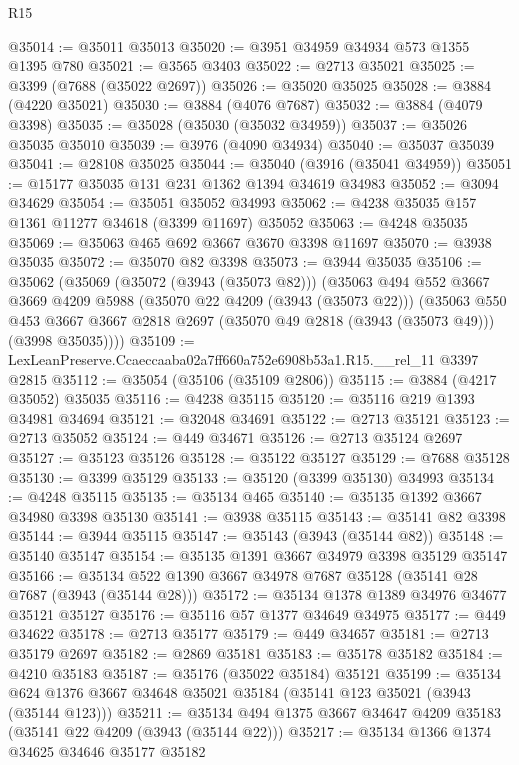 \begin{lexlean}{R15}
\begin{coremodule}
@35014 := @35011 @35013
@35020 := @3951 @34959 @34934 @573 @1355 @1395 @780
@35021 := @3565 @3403
@35022 := @2713 @35021
@35025 := @3399 (@7688 (@35022 @2697))
@35026 := @35020 @35025
@35028 := @3884 (@4220 @35021)
@35030 := @3884 (@4076 @7687)
@35032 := @3884 (@4079 @3398)
@35035 := @35028 (@35030 (@35032 @34959))
@35037 := @35026 @35035 @35010
@35039 := @3976 (@4090 @34934)
@35040 := @35037 @35039
@35041 := @28108 @35025
@35044 := @35040 (@3916 (@35041 @34959))
@35051 := @15177 @35035 @131 @231 @1362 @1394 @34619 @34983
@35052 := @3094 @34629
@35054 := @35051 @35052 @34993
@35062 := @4238 @35035 @157 @1361 @11277 @34618 (@3399 @11697) @35052
@35063 := @4248 @35035
@35069 := @35063 @465 @692 @3667 @3670 @3398 @11697
@35070 := @3938 @35035
@35072 := @35070 @82 @3398
@35073 := @3944 @35035
@35106 := @35062
    (@35069
      (@35072 (@3943 (@35073 @82)))
      (@35063
        @494
        @552
        @3667
        @3669
        @4209
        @5988
        (@35070 @22 @4209 (@3943 (@35073 @22)))
        (@35063
          @550
          @453
          @3667
          @3667
          @2818
          @2697
          (@35070 @49 @2818 (@3943 (@35073 @49)))
          (@3998 @35035))))
@35109 := LexLeanPreserve.Ccaeccaaba02a7ff660a752e6908b53a1.R15.__rel_11 @3397 @2815
@35112 := @35054 (@35106 (@35109 @2806))
@35115 := @3884 (@4217 @35052) @35035
@35116 := @4238 @35115
@35120 := @35116 @219 @1393 @34981 @34694
@35121 := @32048 @34691
@35122 := @2713 @35121
@35123 := @2713 @35052
@35124 := @449 @34671
@35126 := @2713 @35124 @2697
@35127 := @35123 @35126
@35128 := @35122 @35127
@35129 := @7688 @35128
@35130 := @3399 @35129
@35133 := @35120 (@3399 @35130) @34993
@35134 := @4248 @35115
@35135 := @35134 @465
@35140 := @35135 @1392 @3667 @34980 @3398 @35130
@35141 := @3938 @35115
@35143 := @35141 @82 @3398
@35144 := @3944 @35115
@35147 := @35143 (@3943 (@35144 @82))
@35148 := @35140 @35147
@35154 := @35135 @1391 @3667 @34979 @3398 @35129 @35147
@35166 := @35134 @522 @1390 @3667 @34978 @7687 @35128 (@35141 @28 @7687 (@3943 (@35144 @28)))
@35172 := @35134 @1378 @1389 @34976 @34677 @35121 @35127
@35176 := @35116 @57 @1377 @34649 @34975
@35177 := @449 @34622
@35178 := @2713 @35177
@35179 := @449 @34657
@35181 := @2713 @35179 @2697
@35182 := @2869 @35181
@35183 := @35178 @35182
@35184 := @4210 @35183
@35187 := @35176 (@35022 @35184) @35121
@35199 := @35134 @624 @1376 @3667 @34648 @35021 @35184 (@35141 @123 @35021 (@3943 (@35144 @123)))
@35211 := @35134 @494 @1375 @3667 @34647 @4209 @35183 (@35141 @22 @4209 (@3943 (@35144 @22)))
@35217 := @35134 @1366 @1374 @34625 @34646 @35177 @35182

\end{coremodule}
\end{lexlean}
